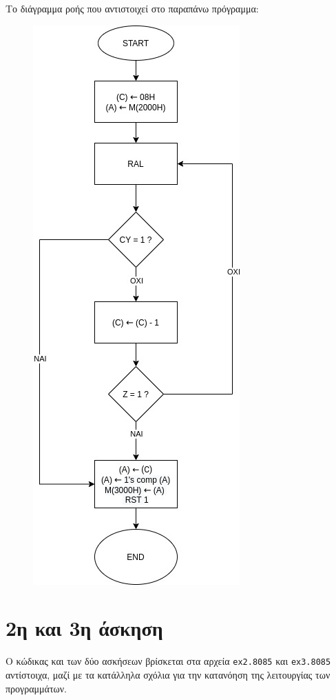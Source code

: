 \documentclass[a4paper]{article}
\begin{document}
\begin{samepage}
Το διάγραμμα ροής που αντιστοιχεί στο παραπάνω πρόγραμμα:

\begin{figure}[H]
	\includegraphics[height=0.85\textheight]{../files/ex1.jpg}
\end{figure}
\end{samepage}
\section*{2η και 3η άσκηση}

Ο κώδικας και των δύο ασκήσεων βρίσκεται στα αρχεία  \texttt{ex2.8085} και \texttt{ex3.8085} αντίστοιχα, μαζί με τα κατάλληλα σχόλια για την κατανόηση της λειτουργίας των προγραμμάτων.
\end{document}
